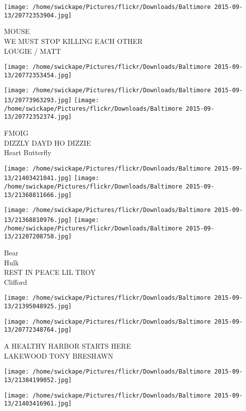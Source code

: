 \documentclass[10pt,letterpaper]{article}
\begin{document}
\vspace{0.25in}
\texttt{[image: /home/swickape/Pictures/flickr/Downloads/Baltimore 2015-09-13/20772353904.jpg]}

MOUSE\\
WE MUST STOP KILLING EACH OTHER\\
LOUGIE / MATT
\pagebreak

\texttt{[image: /home/swickape/Pictures/flickr/Downloads/Baltimore 2015-09-13/20772353454.jpg]}

\vspace{0.25in}
\texttt{[image: /home/swickape/Pictures/flickr/Downloads/Baltimore 2015-09-13/20773963293.jpg]}
\texttt{[image: /home/swickape/Pictures/flickr/Downloads/Baltimore 2015-09-13/20772352374.jpg]}

FMOIG\\
DIZZLY DAYD HO DIZZIE\\
Heart Butterfly
\pagebreak

\texttt{[image: /home/swickape/Pictures/flickr/Downloads/Baltimore 2015-09-13/21403421041.jpg]}
\texttt{[image: /home/swickape/Pictures/flickr/Downloads/Baltimore 2015-09-13/21368811666.jpg]}

\texttt{[image: /home/swickape/Pictures/flickr/Downloads/Baltimore 2015-09-13/21368810976.jpg]}
\texttt{[image: /home/swickape/Pictures/flickr/Downloads/Baltimore 2015-09-13/21207208758.jpg]}

Bear\\
Hulk\\
REST IN PEACE LIL TROY\\
Clifford
\pagebreak

\texttt{[image: /home/swickape/Pictures/flickr/Downloads/Baltimore 2015-09-13/21395048925.jpg]}

\vspace{0.25in}
\texttt{[image: /home/swickape/Pictures/flickr/Downloads/Baltimore 2015-09-13/20772348764.jpg]}

A HEALTHY HARBOR STARTS HERE\\
LAKEWOOD TONY BRESHAWN
\pagebreak

\texttt{[image: /home/swickape/Pictures/flickr/Downloads/Baltimore 2015-09-13/21384199052.jpg]}

\vspace{0.25in}
\texttt{[image: /home/swickape/Pictures/flickr/Downloads/Baltimore 2015-09-13/21403416961.jpg]}
\end{document}
